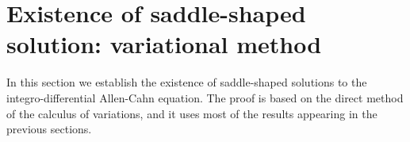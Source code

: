 \documentclass[12pt,reqno]{amsart}
\theoremstyle{definition}
\theoremstyle{remark}
\numberwithin{equation}{section}
\begin{document}
	
	
	
	
	
	\section{Existence of saddle-shaped solution: variational method}
	\label{Sec:Existence}
	
	
	In this section we establish the existence of saddle-shaped solutions to the integro-differential Allen-Cahn equation. The proof is based on the direct method of the calculus of variations, and it uses most of the results appearing in the previous sections.
	
\end{document}
